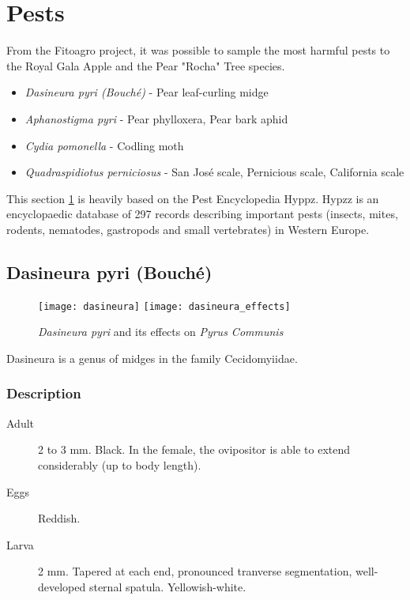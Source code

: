 \section{Pests}
\label{sec:problem_pests}

From the Fitoagro project, it was possible to sample the most harmful pests to the Royal Gala Apple and the Pear "Rocha"  Tree species.

\begin{itemize}
	\item \textit{Dasineura pyri (Bouché)} - Pear leaf-curling midge
	\item \textit{Aphanostigma pyri} - Pear phylloxera, Pear bark aphid
	\item \textit{Cydia pomonella} - Codling moth
	\item \textit{Quadraspidiotus perniciosus} - San José scale, Pernicious scale, California scale
\end{itemize}

This section \ref{sec:problem_pests} is heavily based on the Pest Encyclopedia Hyppz. Hypzz is an encyclopaedic database of 297 records describing important pests (insects, mites, rodents, nematodes, gastropods and small vertebrates) in Western Europe.

\subsection{Dasineura pyri (Bouché)}
\label{sec:problem_pests_cecidomia}

\begin{figure}[htbp]
  \centering
    {\texttt{[image: dasineura]}}%
  \hfill  
    {\texttt{[image: dasineura\_effects]}}%
  \caption{\textit{Dasineura pyri} and its effects on \textit{Pyrus Communis}}
  \label{fig:dasineura_figs}
\end{figure}

Dasineura is a genus of midges in the family Cecidomyiidae. 

\subsubsection{Description}

\begin{description}
	\item [Adult] 2 to 3 mm. Black. In the female, the ovipositor is able to extend considerably (up to body length).
	\item [Eggs] Reddish.
	\item [Larva] 2 mm. Tapered at each end, pronounced tranverse segmentation, well-developed sternal spatula. Yellowish-white.
\end{description}

